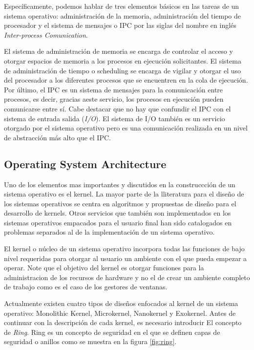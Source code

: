 Específicamente, podemos hablar de tres elementos básicos en las tareas de un
sistema operativo: administración de la memoria, administración del tiempo de
procesador y el sistema de mensajes o IPC por las siglas del nombre en inglés
\emph{Inter-process Comunication}. 

El sistema de administración de memoria se encarga de controlar el acceso y
otorgar espacios de memoria a los procesos en ejecución solicitantes. El
sistema de administración de tiempo o scheduling se encarga de vigilar y
otorgar el uso del procesador a los diferentes procesos que se encuentren en la
cola de ejecución. Por último, el IPC es un sistema de mensajes para la
comunicación entre procesos, es decir, gracias aeste servicio, los procesos en
ejecución pueden comunicarse entre sí. Cabe destacar que no hay que confundir
el IPC con el sistema de entrada salida (\emph{I/O}). El sistema de I/O también
es un servicio otorgado por el sistema operativo pero es una comunicación
realizada en un nivel de abstracción más alto que el IPC.

\subsection{Operating System Architecture} Uno de los elementos mas importantes
y discutidos en la construccción de un sistema operativo es el kernel. La mayor
parte de la lliteratura para el diseño de los sistemas operativos se centra en
algoritmos y propuestas de diseño para el desarrollo de kernels. Otros
servicios que también son implementados en los sistemas operativos empacados
para el usuario final han sido catalogados en problemas separados al de la
implementación de un sistema operativo.

El kernel o núcleo de un sistema operativo incorpora todas las funciones de
bajo nivel requeridas para otorgar al usuario un ambiente con el que pueda
empezar a operar. Note que el objetivo del kernel es otorgar funciones para la
administracion de los recursos de hardware y no el de crear un ambiente
completo de trabajo como es el caso de los gestores de ventanas.

Actualmente existen cuatro tipos de diseños enfocados al kernel de un sistema
operativo: Monolithic Kernel, Microkernel, Nanokernel y Exokernel. Antes de
continuar con la descripción de cada kernel, es necesario introducir El
concepto de \emph{Ring}. Ring es un concepto de seguridad en el que se definen
capas de seguridad o anillos como se muestra en la figura \ref{fig:ring}.

